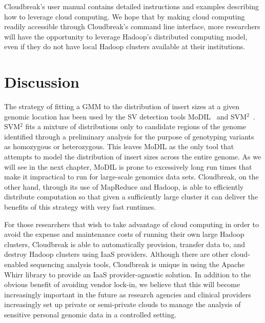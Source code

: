 Cloudbreak's user manual contains detailed instructions and examples describing how to leverage cloud computing. We hope that by making cloud computing readily accessible through Cloudbreak's command line interface, more researchers will have the opportunity to leverage Hadoop's distributed computing model, even if they do not have local Hadoop clusters available at their institutions.

\section{Discussion}

The strategy of fitting a GMM to the distribution of insert sizes at a given genomic location has been used by the SV detection tools MoDIL~\cite{Lee:2009da} and SVM$^2$~\cite{Chiara:2012ey}. SVM$^2$ fits a mixture of distributions only to candidate regions of the genome identified through a preliminary analysis for the purpose of genotyping variants as homozygous or heterozygous. This leaves MoDIL as the only tool that attempts to model the distribution of insert sizes across the entire genome. As we will see in the next chapter, MoDIL is prone to excessively long run times that make it impractical to run for large-scale genomics data sets. Cloudbreak, on the other hand, through its use of MapReduce and Hadoop, is able to efficiently distribute computation so that given a sufficiently large cluster it can deliver the benefits of this strategy with very fast runtimes.

For those researchers that wish to take advantage of cloud computing in order to avoid the expense and maintenance costs of running their own large Hadoop clusters, Cloudbreak is able to automatically provision, transfer data to, and destroy Hadoop clusters using IaaS providers. Although there are other cloud-enabled sequencing analysis tools, Cloudbreak is unique in using the Apache Whirr library to provide an IaaS provider-agnostic solution. In addition to the obvious benefit of avoiding vendor lock-in, we believe that this will become increasingly important in the future as research agencies and clinical providers increasingly set up private or semi-private clouds to manage the analysis of sensitive personal genomic data in a controlled setting.